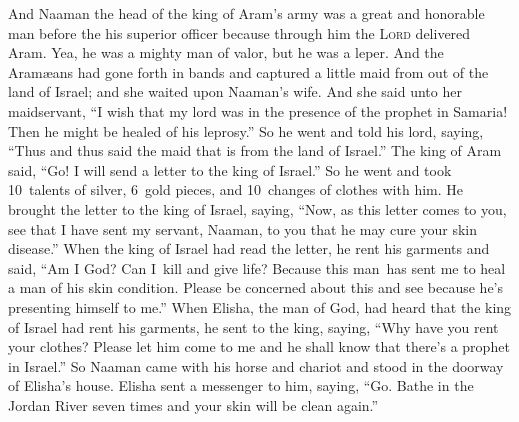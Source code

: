 
\begin{inparaenum}
     And Naaman the head of the king of Aram's army was a great and honorable man before the his superior officer because through him the \textsc{Lord} delivered Aram. Yea, he was a mighty man of valor, but he was a leper.%
     And the Aram\ae{}ans had gone forth in bands and captured a little maid from out of the land of Israel; and she waited upon Naaman's wife.%
     And she said unto her maidservant, ``I wish that my lord was in the presence of the prophet in Samaria! Then he might be healed of his leprosy.''%
     So he went and told his lord, saying, ``Thus and thus said the maid that is from the land of Israel.''%
     The king of Aram said, ``Go! I will send a letter to the king of Israel.'' So he went and took 10~talents of silver, 6~gold pieces, and 10~changes of clothes with him.%
     He brought the letter to the king of Israel, saying, ``Now, as this letter comes to you, see that I have sent my servant, Naaman, to you that he may cure your skin disease.''%
     When the king of Israel had read the letter, he rent his garments and said, ``Am I God? Can I\understood\ kill and give life? Because this man\understood\ has sent me to heal a man of his skin condition. Please be concerned about this and see because he's presenting himself to me.''%
     When Elisha, the man of God, had heard that the king of Israel had rent his garments, he sent to the king, saying, ``Why have you rent your clothes? Please let him come to me and he shall know that there's a prophet in Israel.''%
     So Naaman came with his horse and chariot and stood in the doorway of Elisha's house.%
     Elisha sent a messenger to him, saying, ``Go. Bathe in the Jordan River seven times and your skin will be clean again.''%

\end{inparaenum}
